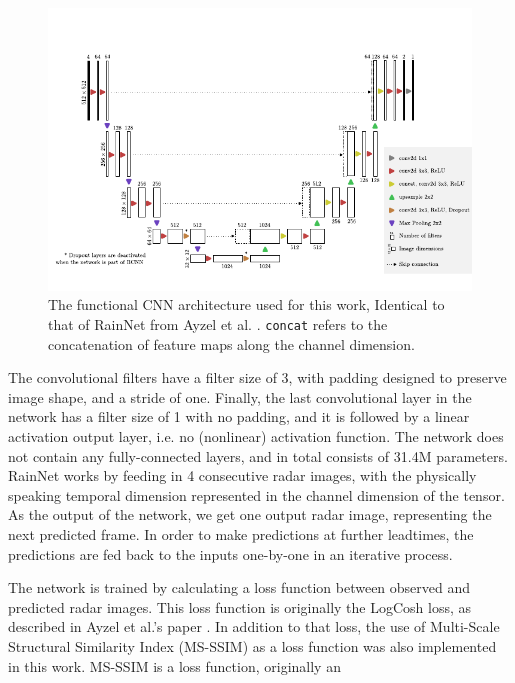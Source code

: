 \begin{figure}[h]
	\label{fig:rainnet}
	\centering
	\includegraphics[scale=1]{images/rainnet_arch/rainnet_arch}
	\caption{The functional CNN architecture used for this work, Identical to that of RainNet from Ayzel et al. \cite{ayzel_rainnet_nodate}. \texttt{concat} refers to the concatenation of feature maps along the channel dimension.}
\end{figure}

The convolutional filters have a filter size of 3, with padding designed to preserve image shape, and a stride of one. Finally, the last convolutional layer in the network has a filter size of 1 with no padding, and it is followed by a linear activation output layer, i.e. no (nonlinear) activation function. The network does not contain any fully-connected layers, and in total consists of 31.4M parameters. RainNet works by feeding in 4 consecutive radar images, with the physically speaking temporal dimension represented in the channel dimension of the tensor. As the output of the network, we get one output radar image, representing the next predicted frame. In order to make predictions at further leadtimes, the predictions are fed back to the inputs one-by-one in an iterative process. 

The network is trained by calculating a loss function between observed and predicted radar images. This loss function is originally the LogCosh loss, as described in Ayzel et al.'s paper \cite{ayzel_rainnet_nodate}. In addition to that loss, the use of Multi-Scale Structural Similarity Index (MS-SSIM) \cite{wang_multiscale_2003} as a loss function was also implemented in this work. MS-SSIM is a loss function, originally an 

